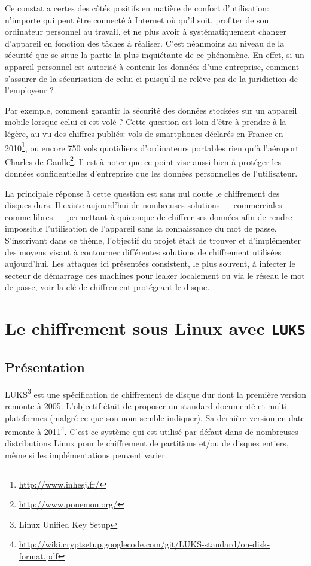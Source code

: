 \documentclass[12pt,a4paper]{article}
\begin{document}
Ce constat a certes des côtés positifs en matière de confort d'utilisation: n'importe qui peut être connecté à Internet où qu'il soit, profiter de son ordinateur personnel au travail, et ne plus avoir à systématiquement changer d'appareil en fonction des tâches à réaliser. C'est néanmoins au niveau de la sécurité que se situe la partie la plus inquiétante de ce phénomène. En effet, si un appareil personnel est autorisé à contenir les données d'une entreprise, comment s'assurer de la sécurisation de celui-ci puisqu'il ne relève pas de la juridiction de l'employeur ? 

Par exemple, comment garantir la sécurité des données stockées sur un appareil mobile lorsque celui-ci est volé ? Cette question est loin d'être à prendre à la légère, au vu des chiffres publiés:  vols de smartphones déclarés en France en 2010\footnote{\url{http://www.inhesj.fr/}}, ou encore 750 vols quotidiens d'ordinateurs portables rien qu'à l'aéroport Charles de Gaulle\footnote{\url{http://www.ponemon.org/}}. Il est à noter que ce point vise aussi bien à protéger les données confidentielles d'entreprise que les données personnelles de l'utilisateur.

La principale réponse à cette question est sans nul doute le chiffrement des disques durs. Il existe aujourd'hui de nombreuses solutions --- commerciales comme libres --- permettant à quiconque de chiffrer ses données afin de rendre impossible l'utilisation de l'appareil sans la connaissance du mot de passe.\\

S'inscrivant dans ce thème, l'objectif du projet était de trouver et d'implémenter des moyens visant à contourner différentes solutions de chiffrement utilisées aujourd'hui. Les attaques ici présentées consistent, le plus souvent, à infecter le secteur de démarrage des machines pour leaker localement ou via le réseau le mot de passe, voir la clé de chiffrement protégeant le disque.


\newpage
\section{Le chiffrement sous Linux avec \texttt{LUKS}}

\subsection{Présentation}

LUKS\footnote{Linux Unified Key Setup} est une spécification de chiffrement de disque dur dont la première version remonte à 2005. L'objectif était de proposer un standard documenté et multi-plateformes (malgré ce que son nom semble indiquer). Sa dernière version en date remonte à 2011\footnote{\url{http://wiki.cryptsetup.googlecode.com/git/LUKS-standard/on-disk-format.pdf}}. C'est ce système qui est utilisé par défaut dans de nombreuses distributions Linux pour le chiffrement de partitions et/ou de disques entiers, même si les implémentations peuvent varier.
\end{document}
